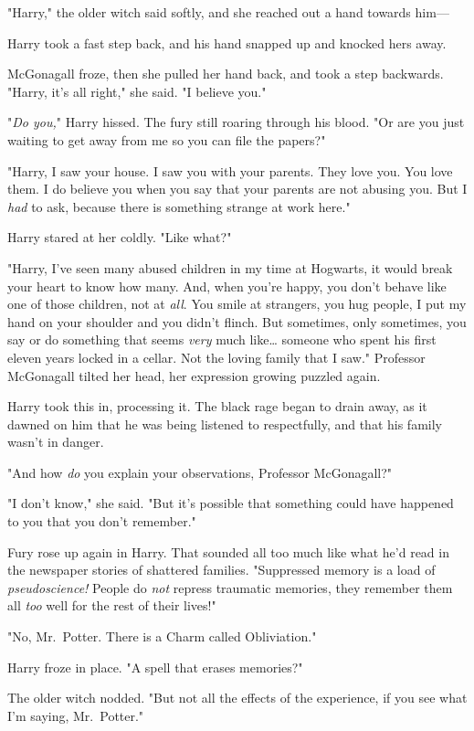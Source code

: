 "Harry," the older witch said softly, and she reached out a hand towards him---

Harry took a fast step back, and his hand snapped up and knocked hers away.

McGonagall froze, then she pulled her hand back, and took a step backwards.
"Harry, it's all right," she said. "I believe you."

"\emph{Do you,}" Harry hissed. The fury still roaring through his blood. "Or
are you just waiting to get away from me so you can file the papers?"

"Harry, I saw your house. I saw you with your parents. They love you. You love
them. I do believe you when you say that your parents are not abusing you. But
I \emph{had} to ask, because there is something strange at work here."

Harry stared at her coldly. "Like what?"

"Harry, I've seen many abused children in my time at Hogwarts, it would break
your heart to know how many. And, when you're happy, you don't behave like one
of those children, not at \emph{all}. You smile at strangers, you hug people, I
put my hand on your shoulder and you didn't flinch. But sometimes, only
sometimes, you say or do something that seems \emph{very} much like{\ldots}
someone who spent his first eleven years locked in a cellar. Not the loving
family that I saw." Professor McGonagall tilted her head, her expression
growing puzzled again.

Harry took this in, processing it. The black rage began to drain away, as it
dawned on him that he was being listened to respectfully, and that his family
wasn't in danger.

"And how \emph{do} you explain your observations, Professor McGonagall?"

"I don't know," she said. "But it's possible that something could have happened
to you that you don't remember."

Fury rose up again in Harry. That sounded all too much like what he'd read in
the newspaper stories of shattered families. "Suppressed memory is a load of
\emph{pseudoscience!} People do \emph{not} repress traumatic memories, they
remember them all \emph{too} well for the rest of their lives!"

"No, Mr.~Potter. There is a Charm called Obliviation."

Harry froze in place. "A spell that erases memories?"

The older witch nodded. "But not all the effects of the experience, if you see
what I'm saying, Mr.~Potter."

